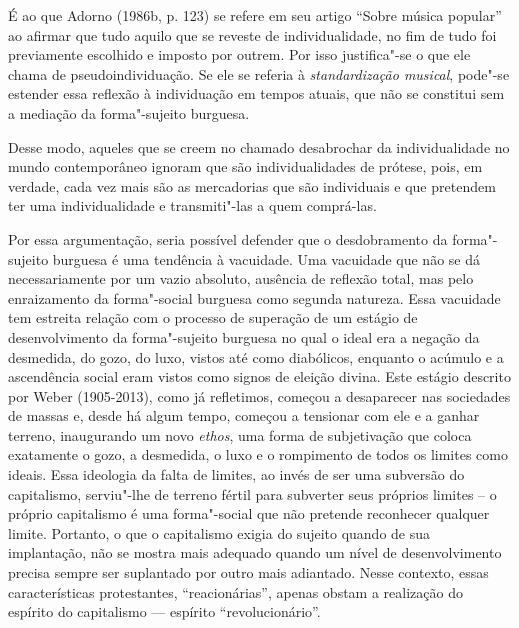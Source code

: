 É ao que Adorno (1986b, p. 123) se refere em seu artigo ``Sobre música
popular'' ao afirmar que tudo aquilo que se reveste de individualidade,
no fim de tudo foi previamente escolhido e imposto por outrem. Por isso
justifica"-se o que ele chama de pseudoindividuação. Se ele se referia à
\emph{standardização musical}, pode"-se estender essa reflexão à
individuação em tempos atuais, que não se constitui sem a mediação da
forma"-sujeito burguesa.

Desse modo, aqueles que se creem no chamado desabrochar da
individualidade no mundo contemporâneo ignoram que são individualidades
de prótese, pois, em verdade, cada vez mais são as mercadorias que são
individuais e que pretendem ter uma individualidade e transmiti"-las a
quem comprá-las.

Por essa argumentação, seria possível defender que o desdobramento da
forma"-sujeito burguesa é uma tendência à vacuidade. Uma vacuidade que
não se dá necessariamente por um vazio absoluto, ausência de reflexão
total, mas pelo enraizamento da forma"-social burguesa como segunda
natureza. Essa vacuidade tem estreita relação com o processo de
superação de um estágio de desenvolvimento da forma"-sujeito burguesa no
qual o ideal era a negação da desmedida, do gozo, do luxo, vistos até
como diabólicos, enquanto o acúmulo e a ascendência social eram vistos
como signos de eleição divina. Este estágio descrito por Weber
(1905-2013), como já refletimos, começou a desaparecer nas sociedades de
massas e, desde há algum tempo, começou a tensionar com ele e a ganhar
terreno, inaugurando um novo \emph{ethos}, uma forma de subjetivação que
coloca exatamente o gozo, a desmedida, o luxo e o rompimento de todos os
limites como ideais. Essa ideologia da falta de limites, ao invés de ser
uma subversão do capitalismo, serviu"-lhe de terreno fértil para
subverter seus próprios limites -- o próprio capitalismo é uma
forma"-social que não pretende reconhecer qualquer limite.
Portanto, o que o capitalismo exigia do sujeito quando de sua
implantação, não se mostra mais adequado quando um nível de
desenvolvimento precisa sempre ser suplantado por outro mais adiantado.
Nesse contexto, essas características protestantes, ``reacionárias'',
apenas obstam a realização do espírito do capitalismo --- espírito
``revolucionário''.

